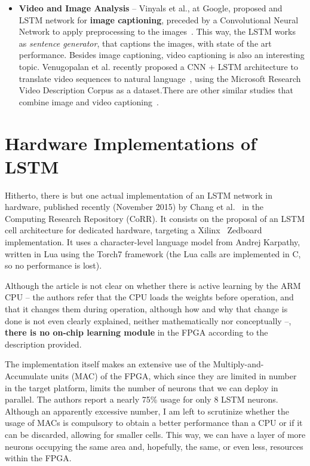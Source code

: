 \begin{itemize}
    \item \textbf{Video and Image Analysis} -- Vinyals et al., at Google, proposed and LSTM network for \textbf{image captioning}, preceded by a Convolutional Neural Network to apply preprocessing to the images~\cite{Vinyals14}. This way, the LSTM works as \emph{sentence generator}, that captions the images, with state of the art performance. 
        Besides image captioning, video captioning is also an interesting topic. Venugopalan et al. recently proposed a CNN + LSTM architecture to translate video sequences to natural language~\cite{Donahue14}, using the Microsoft Research Video Description Corpus as a dataset.There are other similar studies that combine image and video captioning~\cite{Donahue14_2}.


\end{itemize}




\section{Hardware Implementations of LSTM}\label{sec:sa_hardware}
Hitherto, there is but one actual implementation of an LSTM network in hardware, published recently (November 2015) by Chang et al.~\cite{Chang15} in the Computing Research Repository (CoRR). It consists on the proposal of an LSTM cell architecture for dedicated hardware, targeting a Xilinx\textregistered~ Zedboard implementation. It uses a character-level language model from Andrej Karpathy, written in Lua using the Torch7 framework (the Lua calls are implemented in C, so no performance is lost).

Although the article is not clear on whether there is active learning by the ARM CPU -- the authors refer that the CPU loads the weights before operation, and that it changes them during operation, although how and why that change is done is not even clearly explained, neither mathematically nor conceptually --, \textbf{there is no on-chip learning module} in the FPGA according to the description provided. 

The implementation itself makes an extensive use of the Multiply-and-Accumulate units (MAC) of the FPGA, which since they are limited in number in the target platform, limits the number of neurons that we can deploy in parallel. The authors report a nearly 75\% usage for only 8 LSTM neurons. Although an apparently excessive number, I am left to scrutinize whether the usage of MACs is compulsory to obtain a better performance than a CPU or if it can be discarded, allowing for smaller cells. This way, we can have a layer of more neurons occupying the same area and, hopefully, the same, or even less, resources within the FPGA.

